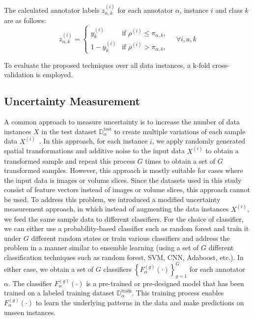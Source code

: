 \documentclass[pdflatex,bst/sn-basic]{bst/sn-jnl}%
\begin{document}
The calculated annotator labels $z_{\alpha,k}^{(i)} $ for each annotator $\alpha $, instance $i $ and class $k $ are as follows:
\begin{equation}
    z_{\alpha,k}^{(i)} =
    \begin{cases}
        y_k^{(i)} & \text{if } \rho^{(i)}  \leq \pi_{\alpha,k}, \\
        1 - y_k^{(i)} & \text{if } \rho^{(i)} > \pi_{\alpha,k},
    \end{cases} \quad \forall i, a, k
    \label{crowd.Eq.4.fictitious_label}
\end{equation}

To evaluate the proposed techniques over all data instances, a k-fold cross-validation is employed.
\subsection{Uncertainty Measurement}
A common approach to measure uncertainty is to increase the number of data instances $X $ in the test dataset $\mathbb{D}_\alpha^{\mathrm{test}} $ to create multiple variations of each sample data $X^{(i)} $~\cite{ayhan_TestTime_2018}. In this approach, for each instance $i $, we apply randomly generated spatial transformations and additive noise to the input data $X^{(i)} $ to obtain a transformed sample and repeat this process $G $ times to obtain a set of $G $ transformed samples.
However, this approach is mostly suitable for cases where the input data is images or volume slices. Since the datasets used in this study consist of feature vectors instead of images or volume slices, this approach cannot be used. To address this problem, we introduced a modified uncertainty measurement approach, in which instead of augmenting the data instances $X^{(i)} $, we feed the same sample data to different classifiers.
For the choice of classifier, we can either use a probability-based classifier such as random forest and train it under $G $ different random states or train various classifiers and address the problem in a manner similar to ensemble learning (using a set of $G $ different classification techniques such as random forest, SVM, CNN, Adaboost, etc.). In either case, we obtain a set of $G $ classifiers ${\left\{F_{\alpha}^{(g)}( \cdot)\right\}}_{g=1}^G $ for each annotator $\alpha $. The classifier $F_{\alpha}^{(g)}( \cdot) $ is a pre-trained or pre-designed model that has been trained on a labeled training dataset $\mathbb{D}_\alpha^{\mathrm{train}} $. This training process enables $F_{\alpha}^{(g)}(\cdot) $ to learn the underlying patterns in the data and make predictions on unseen instances.
\end{document}
